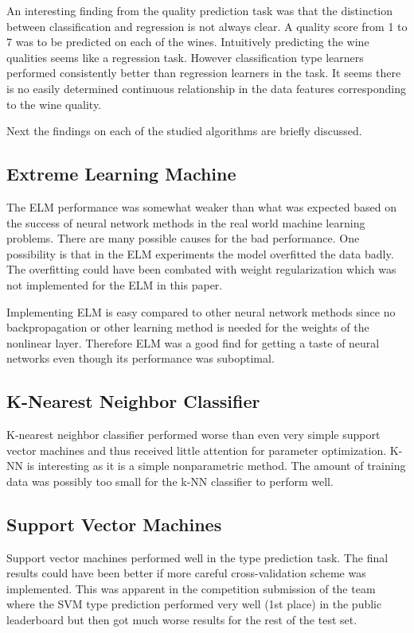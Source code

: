 An interesting finding from the quality prediction task was that the distinction between classification and regression is not always clear. A quality score from 1 to 7 was to be predicted on each of the wines. Intuitively predicting the wine qualities seems like a regression task. However classification type learners performed consistently better than regression learners in the task. It seems there is no easily determined continuous relationship in the data features corresponding to the wine quality.

Next the findings on each of the studied algorithms are briefly discussed.

\subsection{Extreme Learning Machine}
The ELM performance was somewhat weaker than what was expected based on the success of neural network methods in the real world machine learning problems. There are many possible causes for the bad performance. One possibility is that in the ELM experiments the model overfitted the data badly. The overfitting could have been combated with weight regularization which was not implemented for the ELM in this paper.

Implementing ELM is easy compared to other neural network methods since no backpropagation or other learning method is needed for the weights of the nonlinear layer. Therefore ELM was a good find for getting a taste of neural networks even though its performance was suboptimal.

\subsection{K-Nearest Neighbor Classifier}
K-nearest neighbor classifier performed worse than even very simple support vector machines and thus received little attention for parameter optimization. K-NN is interesting as it is a simple nonparametric method. The amount of training data was possibly too small for the k-NN classifier to perform well.

\subsection{Support Vector Machines}
Support vector machines performed well in the type prediction task. The final results could have been better if more careful cross-validation scheme was implemented. This was apparent in the competition submission of the team where the SVM type prediction performed very well (1st place) in the public leaderboard but then got much worse results for the rest of the test set.

